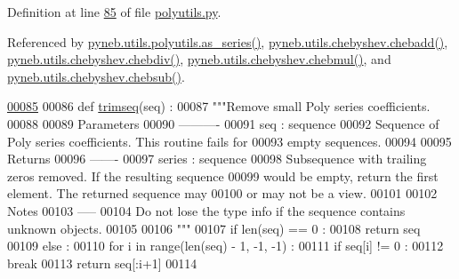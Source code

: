 Definition at line \hyperlink{polyutils_8py_source_l00085}{85} of file \hyperlink{polyutils_8py_source}{polyutils.\-py}.



Referenced by \hyperlink{polyutils_8py_source_l00115}{pyneb.\-utils.\-polyutils.\-as\-\_\-series()}, \hyperlink{chebyshev_8py_source_l00534}{pyneb.\-utils.\-chebyshev.\-chebadd()}, \hyperlink{chebyshev_8py_source_l00725}{pyneb.\-utils.\-chebyshev.\-chebdiv()}, \hyperlink{chebyshev_8py_source_l00676}{pyneb.\-utils.\-chebyshev.\-chebmul()}, and \hyperlink{chebyshev_8py_source_l00584}{pyneb.\-utils.\-chebyshev.\-chebsub()}.


\begin{DoxyCode}
\hypertarget{namespacepyneb_1_1utils_1_1polyutils_l00085}{}\hyperlink{namespacepyneb_1_1utils_1_1polyutils_a973183162fdba436dae4946ec78c009b}{00085} 
00086 \textcolor{keyword}{def }\hyperlink{namespacepyneb_1_1utils_1_1polyutils_a973183162fdba436dae4946ec78c009b}{trimseq}(seq) :
00087     \textcolor{stringliteral}{"""Remove small Poly series coefficients.}
00088 \textcolor{stringliteral}{}
00089 \textcolor{stringliteral}{    Parameters}
00090 \textcolor{stringliteral}{    ----------}
00091 \textcolor{stringliteral}{    seq : sequence}
00092 \textcolor{stringliteral}{        Sequence of Poly series coefficients. This routine fails for}
00093 \textcolor{stringliteral}{        empty sequences.}
00094 \textcolor{stringliteral}{}
00095 \textcolor{stringliteral}{    Returns}
00096 \textcolor{stringliteral}{    -------}
00097 \textcolor{stringliteral}{    series : sequence}
00098 \textcolor{stringliteral}{        Subsequence with trailing zeros removed. If the resulting sequence}
00099 \textcolor{stringliteral}{        would be empty, return the first element. The returned sequence may}
00100 \textcolor{stringliteral}{        or may not be a view.}
00101 \textcolor{stringliteral}{}
00102 \textcolor{stringliteral}{    Notes}
00103 \textcolor{stringliteral}{    -----}
00104 \textcolor{stringliteral}{    Do not lose the type info if the sequence contains unknown objects.}
00105 \textcolor{stringliteral}{}
00106 \textcolor{stringliteral}{    """}
00107     \textcolor{keywordflow}{if} len(seq) == 0 :
00108         \textcolor{keywordflow}{return} seq
00109     \textcolor{keywordflow}{else} :
00110         \textcolor{keywordflow}{for} i \textcolor{keywordflow}{in} range(len(seq) - 1, -1, -1) :
00111             \textcolor{keywordflow}{if} seq[i] != 0 :
00112                 \textcolor{keywordflow}{break}
00113         \textcolor{keywordflow}{return} seq[:i+1]
00114 

\end{DoxyCode}


